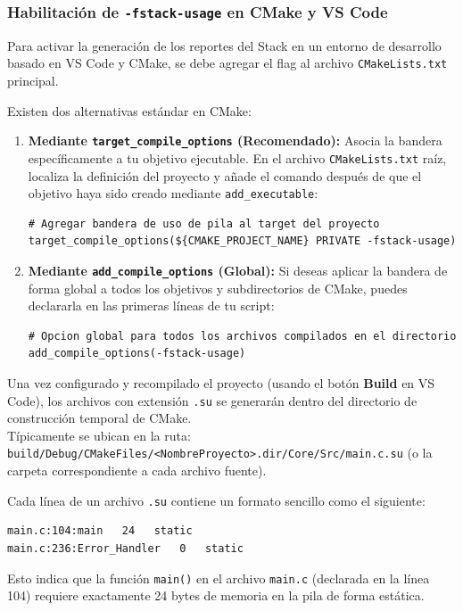 \documentclass[
10pt, %
a4paper, %
oneside, %
headinclude,footinclude, %
BCOR5mm, %
]{scrartcl}
\begin{document}
\subsubsection{Habilitación de \texttt{-fstack-usage} en CMake y VS Code}
Para activar la generación de los reportes del Stack en un entorno de desarrollo basado en VS Code y CMake, se debe agregar el flag al archivo \texttt{CMakeLists.txt} principal.

Existen dos alternativas estándar en CMake:

\begin{enumerate}
	\item \textbf{Mediante \texttt{target\_compile\_options} (Recomendado):}
	Asocia la bandera específicamente a tu objetivo ejecutable. En el archivo \texttt{CMakeLists.txt} raíz, localiza la definición del proyecto y añade el comando después de que el objetivo haya sido creado mediante \texttt{add\_executable}:
\begin{lstlisting}[style=CMakeStyle]
# Agregar bandera de uso de pila al target del proyecto
target_compile_options(${CMAKE_PROJECT_NAME} PRIVATE -fstack-usage)
\end{lstlisting}

	\item \textbf{Mediante \texttt{add\_compile\_options} (Global):}
	Si deseas aplicar la bandera de forma global a todos los objetivos y subdirectorios de CMake, puedes declararla en las primeras líneas de tu script:
\begin{lstlisting}[style=CMakeStyle]
# Opcion global para todos los archivos compilados en el directorio
add_compile_options(-fstack-usage)
\end{lstlisting}
\end{enumerate}

Una vez configurado y recompilado el proyecto (usando el botón \textbf{Build} en VS Code), los archivos con extensión \texttt{.su} se generarán dentro del directorio de construcción temporal de CMake. \\
Típicamente se ubican en la ruta: \\
\texttt{build/Debug/CMakeFiles/<NombreProyecto>.dir/Core/Src/main.c.su} (o la carpeta correspondiente a cada archivo fuente).

Cada línea de un archivo \texttt{.su} contiene un formato sencillo como el siguiente:
\begin{lstlisting}[style=miestiloclaro]
main.c:104:main   24   static
main.c:236:Error_Handler   0   static
\end{lstlisting}
Esto indica que la función \texttt{main()} en el archivo \texttt{main.c} (declarada en la línea 104) requiere exactamente 24 bytes de memoria en la pila de forma estática.
\end{document}
